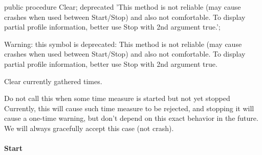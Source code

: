 \documentclass{report}
\newif\ifpdf
\begin{document}
\label{ok_nested_2.TCastleProfiler-Clear}
\begin{list}{}{
\setlength{\itemindent}{0cm}
\setlength{\listparindent}{0cm}
\setlength{\leftmargin}{\evensidemargin}
\addtolength{\leftmargin}{\tmplength}
\settowidth{\labelsep}{X}
\addtolength{\leftmargin}{\labelsep}
\setlength{\labelwidth}{\tmplength}
}
\item[\textbf{Declaration}\hfill]
\ifpdf
\begin{flushleft}
\fi
\begin{ttfamily}
public procedure Clear; deprecated 'This method is not reliable (may cause crashes when used between Start/Stop) and also not comfortable. To display partial profile information, better use Stop with 2nd argument true.';\end{ttfamily}

\ifpdf
\end{flushleft}
\fi

\par
\item[\textbf{Description}]
Warning: this symbol is deprecated: This method is not reliable (may cause crashes when used between Start/Stop) and also not comfortable. To display partial profile information, better use Stop with 2nd argument true.

Clear currently gathered times.

Do not call this when some time measure is started but not yet stopped Currently, this will cause such time measure to be rejected, and stopping it will cause a one{-}time warning, but don't depend on this exact behavior in the future. We will always gracefully accept this case (not crash).

\end{list}
\paragraph*{Start}\hspace*{\fill}
\end{document}
